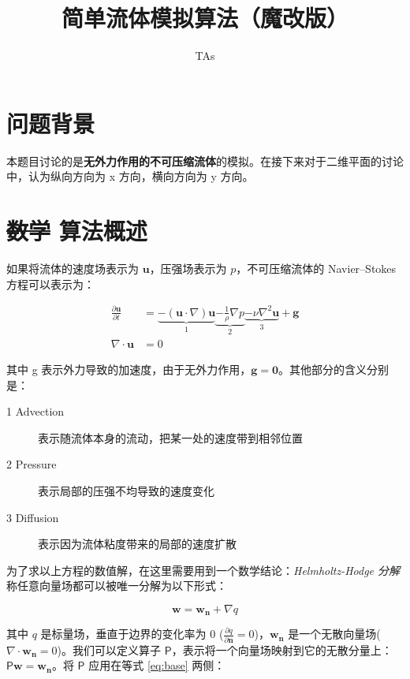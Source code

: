 \documentclass{ctexart}
\title{简单流体模拟算法（魔改版）}
\author{TAs}
\begin{document}
\maketitle

\section{问题背景}

\label{sec:bg}

本题目讨论的是\textbf{无外力作用的不可压缩流体}的模拟。在接下来对于二维平面的讨论中，认为纵向方向为 x 方向，横向方向为 y 方向。

\section{\sout{数学} 算法概述}

如果将流体的速度场表示为 $\mathbf{u}$，压强场表示为 $p$，不可压缩流体的 Navier–Stokes 方程可以表示为：

\begin{equation}
\begin{split}
\label{eq:base}
\frac{\partial \mathbf{u}}{\partial t} & = \underbrace{- (\mathbf{u} \cdot \nabla) \mathbf{u}}_1 \underbrace{- \frac{1}{\rho} \nabla p}_2 \underbrace{- \nu \nabla^2 \mathbf{u}}_3 + \mathbf{g} \\
\nabla \cdot \mathbf{u} & = 0
\end{split}
\end{equation}

其中 g 表示外力导致的加速度，由于无外力作用，$\mathbf{g} = \mathbf{0}$。其他部分的含义分别是：

\begin{description}
  \item[1 Advection] 表示随流体本身的流动，把某一处的速度带到相邻位置
  \item[2 Pressure] 表示局部的压强不均导致的速度变化
  \item[3 Diffusion] 表示因为流体粘度带来的局部的速度扩散
\end{description}

为了求以上方程的数值解，在这里需要用到一个数学结论：\textit{Helmholtz-Hodge 分解} 称任意向量场都可以被唯一分解为以下形式：

\begin{equation}
\label{eq:p-operator}
\mathbf{w} = \mathbf{w_n} + \nabla q
\end{equation}

其中 $q$ 是标量场，垂直于边界的变化率为 0 ($\frac{\partial q}{\partial \mathbf{n}} = 0$)，$\mathbf{w_n}$ 是一个无散向量场($\nabla \cdot \mathbf{w_n} = 0$)。我们可以定义算子 $\mathsf{P}$，表示将一个向量场映射到它的无散分量上：$\mathsf{P} \mathbf{w} = \mathbf{w_n}$。将 $\mathsf{P}$ 应用在等式 \ref{eq:base} 两侧：
\end{document}
